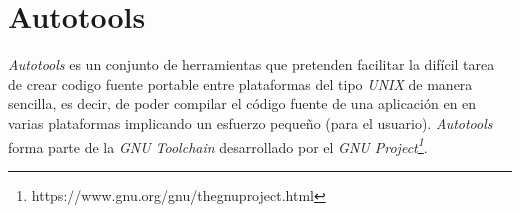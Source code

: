 
\section{Autotools}
\label{appendix:autotools}
 
\textit{Autotools} es un conjunto de herramientas que pretenden facilitar la difícil tarea de crear codigo fuente portable entre plataformas del tipo \textit{UNIX} de manera sencilla, es decir, de poder compilar el código fuente de una aplicación en en varias plataformas implicando un esfuerzo pequeño (para el usuario). \textit{Autotools} forma parte de la \textit{GNU Toolchain} desarrollado por el \textit{GNU Project\footnote{https://www.gnu.org/gnu/thegnuproject.html}}.
